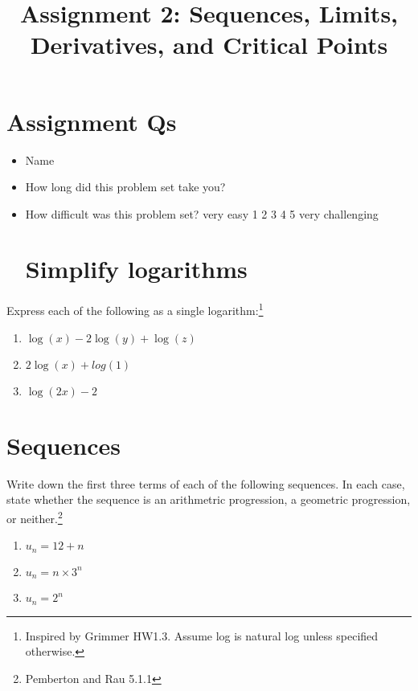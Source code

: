 \documentclass[
  letterpaper,
  DIV=11,
  numbers=noendperiod]{scrartcl}
\title{Assignment 2: Sequences, Limits, Derivatives, and Critical
Points}
\author{}
\date{}
\begin{document}
\maketitle
\ifdefined\Shaded\renewenvironment{Shaded}{\begin{tcolorbox}[frame hidden, enhanced, interior hidden, borderline west={3pt}{0pt}{shadecolor}, breakable, boxrule=0pt, sharp corners]}{\end{tcolorbox}}\fi

\hypertarget{assignment-qs}{%
\section{Assignment Qs}\label{assignment-qs}}

\begin{itemize}
\item
  Name
\item
  How long did this problem set take you?
\item
  How difficult was this problem set? very easy 1 2 3 4 5 very
  challenging

  \hypertarget{simplify-logarithms}{%
  \section{Simplify logarithms}\label{simplify-logarithms}}
\end{itemize}

Express each of the following as a single logarithm:\footnote{Inspired
  by Grimmer HW1.3. Assume log is natural log unless specified
  otherwise.}

\begin{enumerate}
\def\labelenumi{\alph{enumi}.}
\item
  \(\log(x) - 2\log(y) + \log(z)\)
\item
  \(2 \log(x) + log(1)\)
\item
  \(\log(2x) - 2\)
\end{enumerate}

\hypertarget{sequences}{%
\section{Sequences}\label{sequences}}

Write down the first three terms of each of the following sequences. In
each case, state whether the sequence is an arithmetric progression, a
geometric progression, or neither.\footnote{Pemberton and Rau 5.1.1}

\begin{enumerate}
\def\labelenumi{\alph{enumi}.}
\item
  \(u_n = 12 + n\)
\item
  \(u_n = n \times 3^n\)
\item
  \(u_n = 2^n\)
\end{enumerate}
\end{document}
